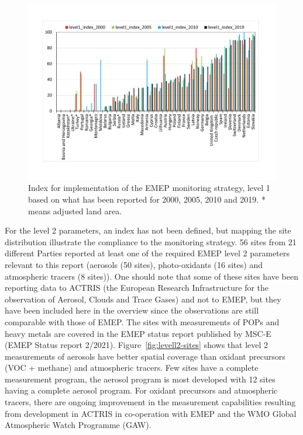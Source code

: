 \begin{figure}
	\centering
	\includegraphics[width=0.74\paperwidth]{FIGS_Obs/index2019.pdf}
	\caption{\label{fig:Index-for-implementation}Index for implementation of the EMEP monitoring strategy, level 1 based on what has been reported for 2000, 2005, 2010 and 2019. {*} means adjusted land area.}
\end{figure}

For the level 2 parameters, an index has not been defined, but mapping the site distribution illustrate the compliance to the monitoring strategy. 56 sites from 21 different Parties reported  at least one of the required  EMEP level 2 parameters relevant to this report (aerosols (50 sites), photo-oxidants (16 sites) and atmospheric tracers (8 sites)). One should note that some of these sites have been reporting data to ACTRIS (the European Research Infrastructure for the observation of Aerosol, Clouds and Trace Gases) and not to EMEP, but they have been included here in the overview since the observations are still comparable with those of EMEP. The sites with measurements of POPs and heavy metals are covered in the EMEP status report published by MSC-E (EMEP Status report 2/2021).  Figure~\ref{fig:levell2-sites} shows that level 2 measurements of aerosols have better spatial coverage than oxidant precursors (VOC + methane) and atmospheric tracers. Few sites have a complete measurement program, the aerosol program is most developed with 12 sites having a complete aerosol program. For oxidant precursors and atmospheric tracers, there are ongoing improvement in the measurement capabilities resulting from development in ACTRIS in co-operation with EMEP and the WMO Global Atmospheric Watch Programme (GAW).

